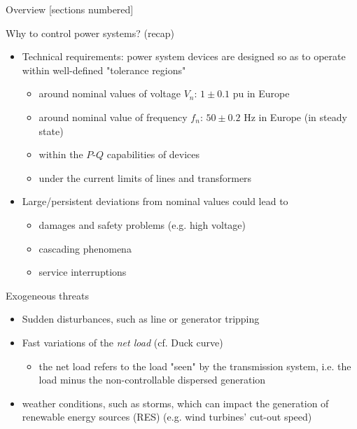 \titleframe

\begin{frame}{Overview}
  [sections numbered]
  \tableofcontents[hideallsubsections]
\end{frame}





\begin{frame}{Why to control power systems? (recap)}
  \begin{itemize}
      \item Technical requirements: power system devices are designed so as to operate within well-defined "tolerance regions" 
      \begin{itemize}
        \item \alert{around nominal values of voltage $V_n$: $1 \pm 0.1$ pu in Europe}
        \item around nominal value of frequency $f_n$: $50 \pm 0.2$  Hz in Europe (in steady state)
        \item \alert{within the $P$-$Q$ capabilities of devices}
        \item under the current limits of lines and transformers
      \end{itemize} 
      \item Large/persistent deviations from nominal values could lead to 
      \begin{itemize}
        \item damages and safety problems (e.g. high voltage)
        \item cascading phenomena
        \item service interruptions
      \end{itemize}
      
  \end{itemize}
\end{frame}

\begin{frame}{Exogeneous threats}
  \begin{itemize}
      \item Sudden disturbances, such as line or generator tripping
      \item Fast variations of the \textit{net load} (cf. Duck curve)
      \begin{itemize}
        \item the net load refers to the load "seen" by the transmission system, i.e. the load minus the non-controllable dispersed generation
      \end{itemize}
      \item weather conditions, such as storms, which can impact the generation of renewable energy sources (RES) (e.g. wind turbines' cut-out speed)
  \end{itemize}
\end{frame}


